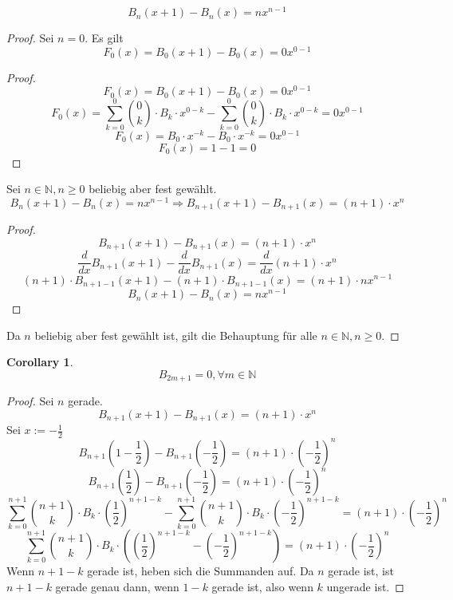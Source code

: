 \documentclass[12pt]{article}
\begin{document}
\[B_n(x+1) - B_n(x) = nx^{n-1}\]
\begin{proof}
Sei \(n = 0\).
Es gilt \[F_0(x) = B_0(x+1) - B_0(x) = 0x^{0-1}\]
\begin{proof}
\[F_0(x) = B_0(x+1) - B_0(x) = 0x^{0-1}\]
\[F_0(x) = \sum_{k=0}^0 {0 \choose k} \cdot B_k \cdot x^{0-k} - \sum_{k=0}^0 {0 \choose k} \cdot B_k \cdot x^{0-k} = 0x^{0-1}\]
\[F_0(x) = B_0 \cdot x^{-k} - B_0 \cdot x^{-k} = 0x^{0-1}\]
\[F_0(x) = 1 - 1 = 0\]
\end{proof}

Sei \(n \in \mathbb{N}, n \geq 0\) beliebig aber fest gewählt.
\[B_n(x+1) - B_n(x) = nx^{n-1} \Longrightarrow B_{n+1}(x+1) - B_{n+1}(x) = (n+1) \cdot x^n\]

\begin{proof}
\[B_{n+1}(x+1) - B_{n+1}(x) = (n+1) \cdot x^n\]
\[\frac{d}{dx} B_{n+1}(x+1) - \frac{d}{dx} B_{n+1}(x) = \frac{d}{dx} (n+1) \cdot x^n\]
\[(n+1) \cdot B_{n+1-1}(x+1) - (n+1) \cdot B_{n+1-1}(x) = (n+1) \cdot nx^{n-1}\]
\[B_{n}(x+1) - B_{n}(x) = nx^{n-1}\]
\end{proof}

Da \(n\) beliebig aber fest gewählt ist, gilt die Behauptung für alle \(n \in \mathbb{N}, n \geq 0\).
\end{proof}

\newtheorem{corollary}{Corollary}[theorem]
\begin{corollary}
\[B_{2m+1}=0, \forall m \in \mathbb{N}\]
\end{corollary}
\begin{proof}
Sei \(n\) gerade.
\[B_{n+1}(x+1) - B_{n+1}(x) = (n+1) \cdot x^n\]
Sei \(x := -\frac{1}{2}\)
\[B_{n+1}\left(1-\frac{1}{2}\right) - B_{n+1}\left(-\frac{1}{2}\right) = (n+1)\cdot\left(-\frac{1}{2}\right)^n\]
\[B_{n+1}\left(\frac{1}{2}\right) - B_{n+1}\left(-\frac{1}{2}\right) = (n+1)\cdot\left(-\frac{1}{2}\right)^n\]
\[\sum_{k=0}^{n+1} {n+1 \choose k} \cdot B_k \cdot \left(\frac{1}{2}\right)^{n+1-k} - \sum_{k=0}^{n+1} {n+1 \choose k} \cdot B_k \cdot \left(-\frac{1}{2}\right)^{n+1-k} = (n+1)\cdot\left(-\frac{1}{2}\right)^n\]
\[\sum_{k=0}^{n+1} {n+1 \choose k} \cdot B_k \cdot \left(\left(\frac{1}{2}\right)^{n+1-k} - \left(-\frac{1}{2}\right)^{n+1-k}\right) = (n+1)\cdot\left(-\frac{1}{2}\right)^n\]
Wenn \(n + 1 - k\) gerade ist, heben sich die Summanden auf. Da \(n\) gerade ist, ist \(n + 1 - k\) gerade genau dann, wenn \(1-k\) gerade ist, also wenn \(k\) ungerade ist.

\end{proof}
\end{document}
